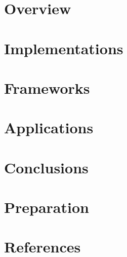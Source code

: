 \section[Overview]{Overview}


\section[Impl]{Implementations}


\section[Frameworks]{Frameworks}


\section[Apps]{Applications}


\section[Concl]{Conclusions}


\section[Prep]{Preparation}
% 


\section[Refs]{References}

